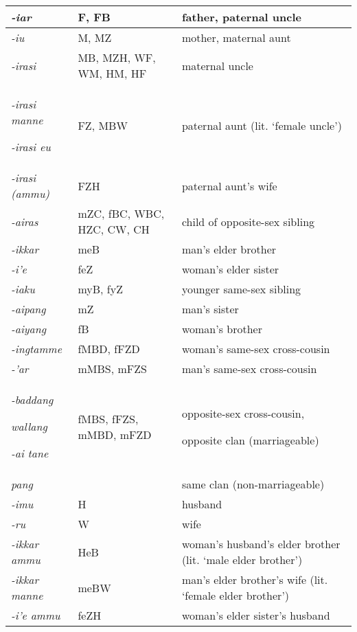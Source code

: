 \begin{center}
\tablehead{}
\begin{supertabular}{|m{1.0288599in}|m{2.32126in}|m{2.55386in}|}
\hline
\textit{{}-iar} &
F, FB &
father, paternal uncle\\\hline
\textit{{}-iu} &
M, MZ &
mother, maternal aunt\\\hline
\textit{{}-irasi} &
MB, MZH, WF, WM, HM, HF &
maternal uncle\\\hline
\textit{{}-irasi manne}

\textit{{}-irasi eu} &
FZ, MBW &
paternal aunt (lit. {\textquoteleft}female uncle{\textquoteright})\\\hline
\textit{{}-irasi (ammu)} &
FZH &
paternal aunt{\textquoteright}s wife\\\hline
\textit{{}-airas} &
mZC, fBC, WBC, HZC, CW, CH &
child of opposite-sex sibling\\\hline
\textit{{}-ikkar} &
meB &
man{\textquoteright}s elder brother\\\hline
\textit{{}-i{\textquoteright}e} &
feZ &
woman{\textquoteright}s elder sister\\\hline
\textit{{}-iaku} &
myB, fyZ &
younger same-sex sibling\\\hline
\textit{{}-aipang} &
mZ &
man{\textquoteright}s sister\\\hline
\textit{{}-aiyang} &
fB &
woman{\textquoteright}s brother\\\hline
\textit{{}-ingtamme} &
fMBD, fFZD &
woman{\textquoteright}s same-sex cross-cousin\\\hline
\textit{{}-{\textquoteright}ar} &
mMBS, mFZS &
man{\textquoteright}s same-sex cross-cousin\\\hline
\textit{{}-baddang}

\textit{wallang}

\textit{{}-ai tane} &
fMBS, fFZS, mMBD, mFZD &
opposite-sex cross-cousin,

opposite clan (marriageable)\\\hline
\textit{pang} &
 &
same clan (non-marriageable)\\\hline
\textit{{}-imu} &
H &
husband\\\hline
\textit{{}-ru} &
W &
wife\\\hline
\textit{{}-ikkar ammu} &
HeB &
woman{\textquoteright}s husband{\textquoteright}s elder brother \newline
(lit. {\textquoteleft}male elder brother{\textquoteright})\\\hline
\textit{{}-ikkar manne} &
meBW &
man{\textquoteright}s elder brother{\textquoteright}s wife \newline
(lit. {\textquoteleft}female elder brother{\textquoteright})\\\hline
\textit{{}-i{\textquoteright}e ammu} &
feZH &
woman{\textquoteright}s elder sister{\textquoteright}s husband


\end{supertabular}
\end{center}
